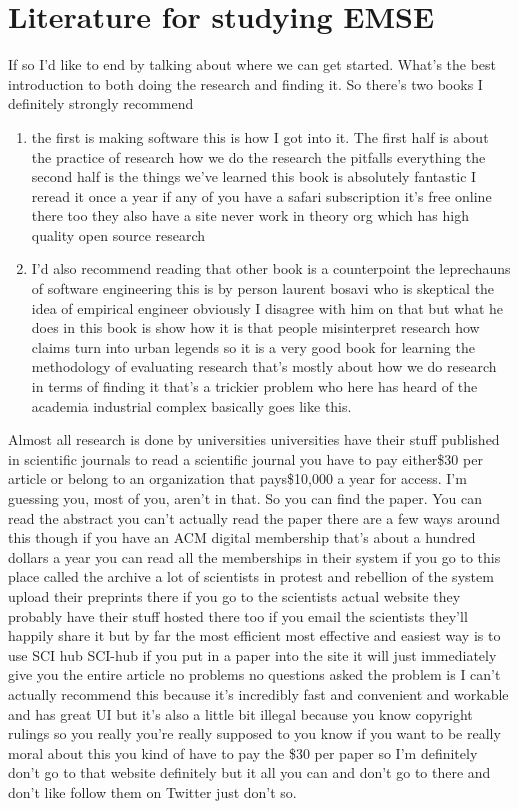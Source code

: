 \documentclass[conference, compsoc, twoside]{IEEEtran}
\begin{document}
\section{Literature for studying EMSE}
If so I'd like to end by talking about where we can get started.
What's the best introduction to both doing the research and finding it.
So there's two books I definitely strongly recommend
\begin{enumerate}
	\item the first is making software this is how I got into it. 
	The first half is about the practice of research how we do the
research the pitfalls everything the
second half is the things we've learned
this book is absolutely fantastic I
reread it once a year if any of you have
a safari subscription it's free online
there too they also have a site never
work in theory org which has high
quality open source research
\item I'd also recommend reading that other book is a
counterpoint the leprechauns of software
engineering this is by person laurent
bosavi who is skeptical the idea of
empirical engineer
obviously I disagree with him on that
but what he does in this book is show
how it is that people misinterpret
research how claims turn into urban
legends so it is a very good book for
learning the methodology of evaluating
research that's mostly about how we do
research in terms of finding it
that's a trickier problem who here has heard of the academia industrial complex
basically goes like this.
\end{enumerate}
Almost all research is done by universities universities have their
stuff published in scientific journals
to read a scientific journal you have to
pay either\$30 per article or belong to
an organization that pays\$10,000 a year for access.
I'm guessing you, most of you, aren't in that. 
So you can find the paper. You can read the abstract you can't
actually read the paper there are a few
ways around this though if you have an
ACM digital membership that's about a
hundred dollars a year you can read all
the memberships in their system if you
go to this place called the archive a
lot of scientists in protest and
rebellion of the system upload their
preprints there if you go to the
scientists actual website they probably
have their stuff hosted there too if you
email the scientists they'll happily
share it but by far the most efficient
most effective and easiest way is to use
SCI hub SCI-hub if you put in a
paper into the site it will just
immediately give you the entire article
no problems no questions asked the
problem is I can't actually recommend
this because it's incredibly fast and
convenient and workable and has great UI
but it's also a little bit illegal
because you know copyright rulings so
you really you're really supposed to you
know if you want to be really moral
about this you kind of have to pay the
\$30 per paper so I'm definitely don't go
to that website definitely but it all
you can and don't go to there and don't like follow them on Twitter just don't so.
\end{document}
